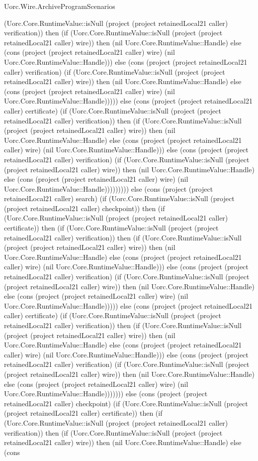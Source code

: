 \begin{lexlean}{Uorc.Wire.ArchiveProgramScenarios}
\begin{semanticmodule}
{(Uorc.Core.RuntimeValue::isNull (project (project retainedLocal21 caller) verification)) then (if (Uorc.Core.RuntimeValue::isNull (project (project retainedLocal21 caller) wire)) then (nil Uorc.Core.RuntimeValue::Handle) else (cons (project (project retainedLocal21 caller) wire) (nil Uorc.Core.RuntimeValue::Handle))) else (cons (project (project retainedLocal21 caller) verification) (if (Uorc.Core.RuntimeValue::isNull (project (project retainedLocal21 caller) wire)) then (nil Uorc.Core.RuntimeValue::Handle) else (cons (project (project retainedLocal21 caller) wire) (nil Uorc.Core.RuntimeValue::Handle))))) else (cons (project (project retainedLocal21 caller) certificate) (if (Uorc.Core.RuntimeValue::isNull (project (project retainedLocal21 caller) verification)) then (if (Uorc.Core.RuntimeValue::isNull (project (project retainedLocal21 caller) wire)) then (nil Uorc.Core.RuntimeValue::Handle) else (cons (project (project retainedLocal21 caller) wire) (nil Uorc.Core.RuntimeValue::Handle))) else (cons (project (project retainedLocal21 caller) verification) (if (Uorc.Core.RuntimeValue::isNull (project (project retainedLocal21 caller) wire)) then (nil Uorc.Core.RuntimeValue::Handle) else (cons (project (project retainedLocal21 caller) wire) (nil Uorc.Core.RuntimeValue::Handle))))))))) else (cons (project (project retainedLocal21 caller) search) (if (Uorc.Core.RuntimeValue::isNull (project (project retainedLocal21 caller) checkpoint)) then (if (Uorc.Core.RuntimeValue::isNull (project (project retainedLocal21 caller) certificate)) then (if (Uorc.Core.RuntimeValue::isNull (project (project retainedLocal21 caller) verification)) then (if (Uorc.Core.RuntimeValue::isNull (project (project retainedLocal21 caller) wire)) then (nil Uorc.Core.RuntimeValue::Handle) else (cons (project (project retainedLocal21 caller) wire) (nil Uorc.Core.RuntimeValue::Handle))) else (cons (project (project retainedLocal21 caller) verification) (if (Uorc.Core.RuntimeValue::isNull (project (project retainedLocal21 caller) wire)) then (nil Uorc.Core.RuntimeValue::Handle) else (cons (project (project retainedLocal21 caller) wire) (nil Uorc.Core.RuntimeValue::Handle))))) else (cons (project (project retainedLocal21 caller) certificate) (if (Uorc.Core.RuntimeValue::isNull (project (project retainedLocal21 caller) verification)) then (if (Uorc.Core.RuntimeValue::isNull (project (project retainedLocal21 caller) wire)) then (nil Uorc.Core.RuntimeValue::Handle) else (cons (project (project retainedLocal21 caller) wire) (nil Uorc.Core.RuntimeValue::Handle))) else (cons (project (project retainedLocal21 caller) verification) (if (Uorc.Core.RuntimeValue::isNull (project (project retainedLocal21 caller) wire)) then (nil Uorc.Core.RuntimeValue::Handle) else (cons (project (project retainedLocal21 caller) wire) (nil Uorc.Core.RuntimeValue::Handle))))))) else (cons (project (project retainedLocal21 caller) checkpoint) (if (Uorc.Core.RuntimeValue::isNull (project (project retainedLocal21 caller) certificate)) then (if (Uorc.Core.RuntimeValue::isNull (project (project retainedLocal21 caller) verification)) then (if (Uorc.Core.RuntimeValue::isNull (project (project retainedLocal21 caller) wire)) then (nil Uorc.Core.RuntimeValue::Handle) else (cons }
\end{semanticmodule}
\end{lexlean}
